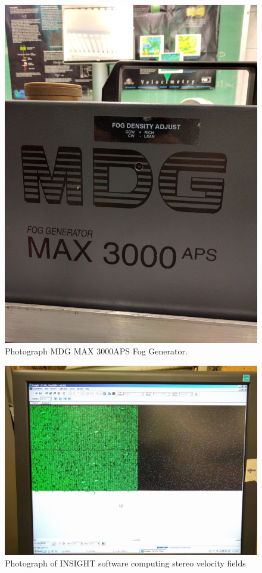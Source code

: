 \begin{figure}[H]
	\centering
	\includegraphics[width=5in]{figs/piv_method/fog_generator}
	\caption{Photograph MDG MAX 3000APS Fog Generator.}
	\label{fig:fog_machine}
\end{figure}

\begin{figure}[H]
	\centering
	\includegraphics[width=5in]{figs/piv_method/INSIGHT_processing}
	\caption{Photograph of INSIGHT software computing stereo velocity fields}
	\label{fig:processing_screenshot}
\end{figure}

